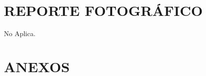 \section{REPORTE FOTOGR\'AFICO}\label{sec:q}
No Aplica.
\section{ANEXOS}\label{sec:r}




\label{lastpage}

